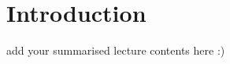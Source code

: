 \section{Introduction}

\begin{remark}
    add your summarised lecture contents here :)
\end{remark}